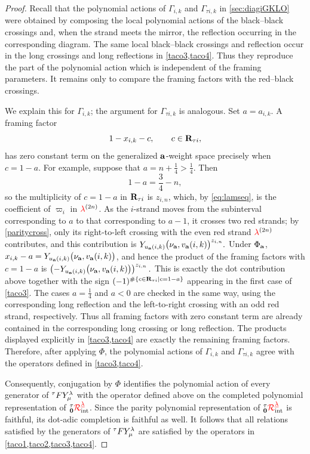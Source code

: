 \begin{proof}
Recall that the polynomial actions of
\(\Gamma_{i,k}\) and \(\Gamma_{\tau i,k}\) in
\cref{sec:diagiGKLO} were obtained by composing the local polynomial
actions of the black--black crossings and, when the strand meets the
mirror, the reflection occurring in the corresponding diagram.
The same local black--black crossings and reflection occur in the
long crossings and long reflections in \cref{taco3,taco4}.
Thus they reproduce the part of the polynomial action which is
independent of the framing parameters. It remains only to compare the
framing factors with the red--black crossings.

We explain this for \(\Gamma_{i,k}\); the argument for
\(\Gamma_{\tau i,k}\) is analogous. Set \(a=a_{i,k}\). A framing
factor
\[
1-x_{i,k}-c,
\qquad c\in\mathbf{R}_{\tau i},
\]
has zero constant term on the generalized \(\mathbf{a}\)-weight space
precisely when \(c=1-a\). For example, suppose that
\(a=n+\frac14>\frac14\). Then
\[
1-a=\frac34-n,
\]
so the multiplicity of \(c=1-a\) in \(\mathbf{R}_{\tau i}\) is \(z_{i,n}\),
which, by \cref{eq:lamseq}, is the coefficient of \(\varpi_i\) in
\({\color{red}\lambda}^{(2n)}\). As the \(i\)-strand moves from the subinterval
corresponding to \(a\) to that corresponding to \(a-1\), it crosses
two red strands; by \cref{paritycross}, only its right-to-left
crossing with the even red strand \({\color{red}\lambda}^{(2n)}\) contributes, and
this contribution is
\(
Y_{u_{\mathbf{a}}(i,k)}
\bigl(\nu_{\mathbf{a}},v_{\mathbf{a}}(i,k)\bigr)^{z_{i,n}}.
\)
Under \(\Phi_{\mathbf{a}}\), \(x_{i,k}-a=Y_{u_{\mathbf{a}}(i,k)}
\bigl(\nu_{\mathbf{a}},v_{\mathbf{a}}(i,k)\bigr)\), and hence the product of the
framing factors with \(c=1-a\) is
\(
\left(
-
Y_{u_{\mathbf{a}}(i,k)}
\bigl(\nu_{\mathbf{a}},v_{\mathbf{a}}(i,k)\bigr)
\right)^{z_{i,n}}.
\)
This is exactly the dot contribution above together with the sign
\(
(-1)^{\#\{c\in\mathbf{R}_{\tau i}\mid c=1-a\}}
\)
appearing in the first case of \cref{taco3}. The cases
\(a=\frac14\) and \(a<0\) are checked in the same way, using the
corresponding long reflection and the left-to-right crossing with an
odd red strand, respectively. Thus all framing factors with zero
constant term are already contained in the corresponding long
crossing or long reflection. The products displayed explicitly in
\cref{taco3,taco4} are exactly the remaining framing factors.
Therefore, after applying \(\Phi\), the polynomial actions of
\(\Gamma_{i,k}\) and \(\Gamma_{\tau i,k}\) agree with the operators
defined in \cref{taco3,taco4}.



Consequently, conjugation by \(\Phi\) identifies the polynomial action
of every generator of \({}^\tau F Y_\mu^\lambda\) with the operator defined above on
the completed polynomial representation of \({{}^\tau_{\mathbf{0}}{\color{red}\mathcal{R}}^{{{\color{red}\underline{\lambda}}}}_{\text{int}}}\). Since the parity
polynomial representation of \({{}^\tau_{\mathbf{0}}{\color{red}\mathcal{R}}^{{{\color{red}\underline{\lambda}}}}_{\text{int}}}\) is faithful, its dot-adic
completion is faithful as well. It follows that all relations
satisfied by the generators of \({}^\tau F Y_\mu^\lambda\) are satisfied by the
operators in \cref{taco1,taco2,taco3,taco4}.


\end{proof}

